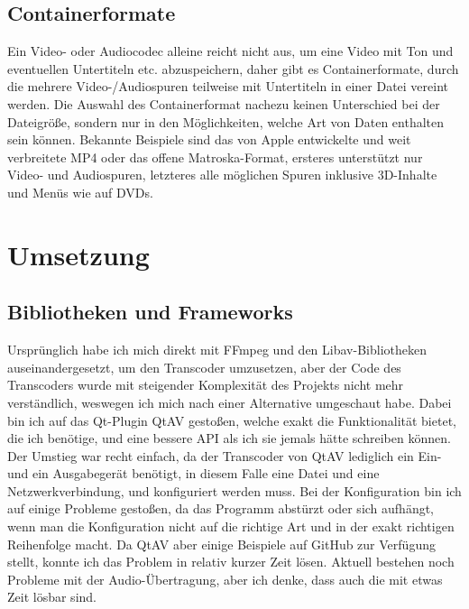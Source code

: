 \documentclass{article}
\begin{document}
    \subsection{Containerformate}\label{subsec:containerformate}

    Ein Video- oder Audiocodec alleine reicht nicht aus, um eine Video mit
    Ton und eventuellen Untertiteln etc. abzuspeichern, daher gibt es
    Containerformate, durch die mehrere Video-/Audiospuren teilweise mit
    Untertiteln in einer Datei vereint werden. Die Auswahl des
    Containerformat nachezu keinen Unterschied bei der Dateigröße, sondern
    nur in den Möglichkeiten, welche Art von Daten enthalten sein können.
    Bekannte Beispiele sind das von Apple entwickelte und weit verbreitete
    MP4 oder das offene Matroska-Format, ersteres unterstützt nur Video- und
    Audiospuren, letzteres alle möglichen Spuren inklusive 3D-Inhalte und
    Menüs wie auf DVDs.

    \newpage


    \section{Umsetzung}\label{sec:umsetzung}

    \subsection{Bibliotheken und Frameworks}\label{subsec:bibliotheken-und-frameworks}

    Ursprünglich habe ich mich direkt mit FFmpeg und den Libav-Bibliotheken
    auseinandergesetzt, um den Transcoder umzusetzen, aber der Code des
    Transcoders wurde mit steigender Komplexität des Projekts nicht mehr
    verständlich, weswegen ich mich nach einer Alternative umgeschaut habe.
    Dabei bin ich auf das Qt-Plugin QtAV gestoßen, welche exakt die
    Funktionalität bietet, die ich benötige, und eine bessere API als ich
    sie jemals hätte schreiben können. Der Umstieg war recht einfach, da der
    Transcoder von QtAV lediglich ein Ein- und ein Ausgabegerät benötigt, in
    diesem Falle eine Datei und eine Netzwerkverbindung, und konfiguriert
    werden muss. Bei der Konfiguration bin ich auf einige Probleme gestoßen,
    da das Programm abstürzt oder sich aufhängt, wenn man die Konfiguration
    nicht auf die richtige Art und in der exakt richtigen Reihenfolge macht.
    Da QtAV aber einige Beispiele auf GitHub zur Verfügung stellt, konnte
    ich das Problem in relativ kurzer Zeit lösen. Aktuell bestehen noch
    Probleme mit der Audio-Übertragung, aber ich denke, dass auch die mit
    etwas Zeit lösbar sind.
\end{document}
